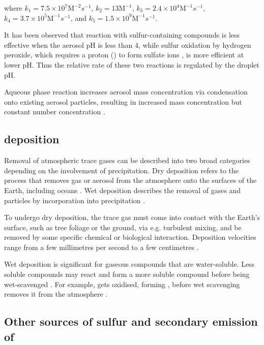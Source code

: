 where 
$k_1 = 7.5 \times 10^7 \mathrm{M}^{-2}s^{-1}$,
$k_2 = 13 \mathrm{M}^{-1}$,
$k_3 = 2.4 \times 10^4 \mathrm{M}^{-1}s^{-1}$,
$k_4 = 3.7 \times 10^5 \mathrm{M}^{-1}s^{-1}$, and
$k_5 = 1.5 \times 10^9 \mathrm{M}^{-1}s^{-1}$. 

It has been observed that  reaction with sulfur-containing compounds is less effective when the aerosol pH is less than 4, while sulfur oxidation by hydrogen peroxide, which requires a proton () to form sulfate ions \citep{seinfeldAtmosphericChemistryPhysics2016}, is more efficient at lower pH. Thus the relative rate of these two reactions is regulated by the droplet pH. 

Aqueous phase reaction increases aerosol mass concentration via condensation onto existing aerosol particles, resulting in increased mass concentration but constant number concentration \citep{seinfeldAtmosphericChemistryPhysics2016}.


\subsection{ deposition}

Removal of atmospheric trace gases can be described into two broad categories depending on the involvement of precipitation. Dry deposition refers to the process that removes gas or aerosol from the atmosphere onto the surfaces of the Earth, including oceans \citep{dewysAssessmentFateSulfur1978}.  Wet deposition describes the removal of gases and particles by incorporation into precipitation \citep{wayneChemistryAtmospheresIntroduction2006}. 

To undergo dry deposition, the trace gas must come into contact with the Earth's surface, such as tree foliage or the ground, via e.g. turbulent mixing, and be removed by some specific chemical or biological interaction.  Deposition velocities range from a few millimetres per second to a few centimetres \citep[e.g.][]{smithAirborneTransportSulphur1975, hardacreEvaluationSO2SO422021, mulcahyUKESM1DevelopmentEvaluation2022}.

Wet deposition is significant for gaseous compounds that are water-soluble. Less soluble compounds may react and form a more soluble compound before being wet-scavenged \citep{wayneChemistryAtmospheresIntroduction2006}. For example,  gets oxidised, forming , before wet scavenging removes it from the atmosphere \citep{seinfeldAtmosphericChemistryPhysics2016}.


\subsection{Other sources of sulfur and secondary emission of }
\label{ch1:other-so2}

